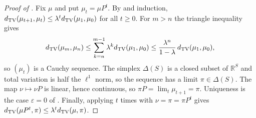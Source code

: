 \begin{proof}[Proof of ]
Fix $\mu$ and put $\mu_t=\mu P^t$.
By  and induction, $d_{\mathrm{TV}}(\mu_{t+1},\mu_t)\le\lambda^td_{\mathrm{TV}}(\mu_1,\mu_0)$ for all $t\ge 0$.
For $m>n$ the triangle inequality gives
\[
  d_{\mathrm{TV}}(\mu_m,\mu_n)\le\sum_{k=n}^{m-1}\lambda^kd_{\mathrm{TV}}(\mu_1,\mu_0)\le\frac{\lambda^n}{1-\lambda}\,d_{\mathrm{TV}}(\mu_1,\mu_0),
\]
so $(\mu_t)$ is a Cauchy sequence.
The simplex $\Delta(S)$ is a closed subset of $\mathbb{R}^S$ and total variation is half the $\ell^1$ norm, so the sequence has a limit $\pi\in\Delta(S)$.
The map $\nu\mapsto\nu P$ is linear, hence continuous, so $\pi P=\lim_t\mu_{t+1}=\pi$.
Uniqueness is the case $\varepsilon=0$ of \thmNGObjectContractive.
Finally, applying  $t$ times with $\nu=\pi=\pi P^t$ gives $d_{\mathrm{TV}}(\mu P^t,\pi)\le\lambda^td_{\mathrm{TV}}(\mu,\pi)$.
\end{proof}
